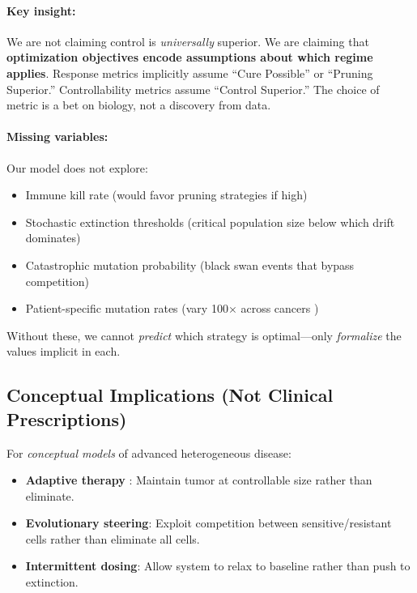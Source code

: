 \documentclass[11pt,a4paper]{article}
\begin{document}
\paragraph{Key insight:} We are not claiming control is \textit{universally} superior. We are claiming that \textbf{optimization objectives encode assumptions about which regime applies}. Response metrics implicitly assume ``Cure Possible'' or ``Pruning Superior.'' Controllability metrics assume ``Control Superior.'' The choice of metric is a bet on biology, not a discovery from data.

\paragraph{Missing variables:} Our model does not explore:
\begin{itemize}
    \item Immune kill rate (would favor pruning strategies if high)
    \item Stochastic extinction thresholds (critical population size below which drift dominates)
    \item Catastrophic mutation probability (black swan events that bypass competition)
    \item Patient-specific mutation rates (vary 100$\times$ across cancers \citep{alexandrov2013signatures})
\end{itemize}

Without these, we cannot \textit{predict} which strategy is optimal---only \textit{formalize} the values implicit in each.

\subsection{Conceptual Implications (Not Clinical Prescriptions)}

For \textit{conceptual models} of advanced heterogeneous disease:

\begin{itemize}
    \item \textbf{Adaptive therapy} \citep{gatenby2009adaptive}: Maintain tumor at controllable size rather than eliminate.
    \item \textbf{Evolutionary steering}: Exploit competition between sensitive/resistant cells rather than eliminate all cells.
    \item \textbf{Intermittent dosing}: Allow system to relax to baseline rather than push to extinction.
\end{itemize}
\end{document}
